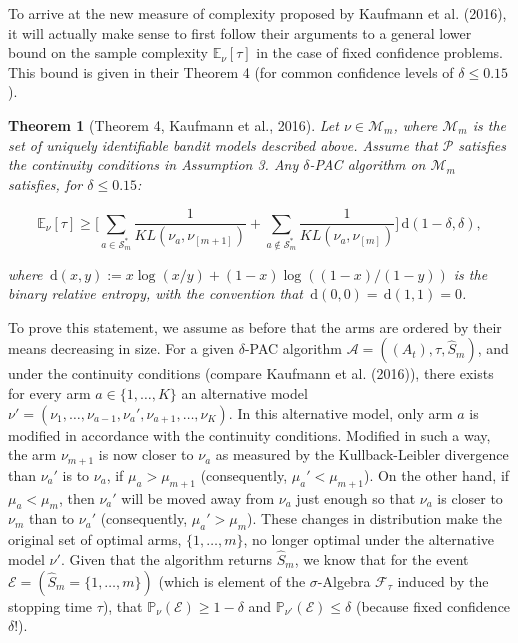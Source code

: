 \documentclass[12pt,]{article}
\newtheorem{theorem}{Theorem}
\newcommand{\der}{\,\text{d}}
\begin{document}
To arrive at the new measure of complexity proposed by Kaufmann et al.
(2016), it will actually make sense to first follow their arguments to a
general lower bound on the sample complexity \(\mathbb{E}_{\nu}[\tau]\)
in the case of fixed confidence problems. This bound is given in their
Theorem 4 (for common confidence levels of \(\delta \leq 0.15\)).

\begin{theorem}[Theorem 4, Kaufmann et al., 2016] \label{theorem:KaufmannEtAlTheorem4}
Let $\nu \in \mathcal{M}_m$, where $\mathcal{M}_m$ is the set of uniquely identifiable bandit models described above. Assume that $\mathcal{P}$ satisfies the continuity conditions in Assumption 3. Any $\delta$-PAC algorithm on $\mathcal{M}_m$ satisfies, for $\delta \leq 0.15$:

\begin{equation*}
\mathbb{E}_{\nu}[\tau] \geq \Big[ \sum_{a \in \mathcal{S}^*_m} \frac{1}{KL(\nu_a, \nu_{[m+1]})} + \sum_{a \notin \mathcal{S}^*_m} \frac{1}{KL(\nu_a, \nu_{[m]})} \Big] \der(1-\delta, \delta),
\end{equation*}

where $\der(x,y) := x \log(x/y) + (1-x) \log((1-x)/(1-y))$ is the binary relative entropy, with the convention that $\der(0,0) = \der(1,1) = 0$.
\end{theorem}

To prove this statement, we assume as before that the arms are ordered
by their means decreasing in size. For a given \(\delta\)-PAC algorithm
\(\mathcal{A} = ((A_t), \tau, \hat{S}_m)\), and under the continuity
conditions (compare Kaufmann et al. (2016)), there exists for every arm
\(a \in \{1, \dots, K\}\) an alternative model
\(\nu' = (\nu_1, \dots, \nu_{a-1}, \nu_a', \nu_{a+1}, \dots, \nu_K)\).
In this alternative model, only arm \(a\) is modified in accordance with
the continuity conditions. Modified in such a way, the arm \(\nu_{m+1}\)
is now closer to \(\nu_a\) as measured by the Kullback-Leibler
divergence than \(\nu_a'\) is to \(\nu_a\), if \(\mu_a > \mu_{m+1}\)
(consequently, \(\mu_a' < \mu_{m+1}\)). On the other hand, if
\(\mu_a < \mu_{m}\), then \(\nu_a'\) will be moved away from \(\nu_a\)
just enough so that \(\nu_a\) is closer to \(\nu_m\) than to \(\nu_a'\)
(consequently, \(\mu_a' > \mu_m\)). These changes in distribution make
the original set of optimal arms, \(\{1,\dots,m\}\), no longer optimal
under the alternative model \(\nu'\). Given that the algorithm returns
\(\hat{S}_m\), we know that for the event
\(\mathcal{E} = (\hat{S}_m = \{1, \dots, m\})\) (which is element of the
\(\sigma\)-Algebra \(\mathcal{F}_{\tau}\) induced by the stopping time
\(\tau\)), that \(\mathbb{P}_{\nu}(\mathcal{E}) \geq 1-\delta\) and
\(\mathbb{P}_{\nu'}(\mathcal{E}) \leq \delta\) (because fixed confidence
\(\delta\)!).
\end{document}
